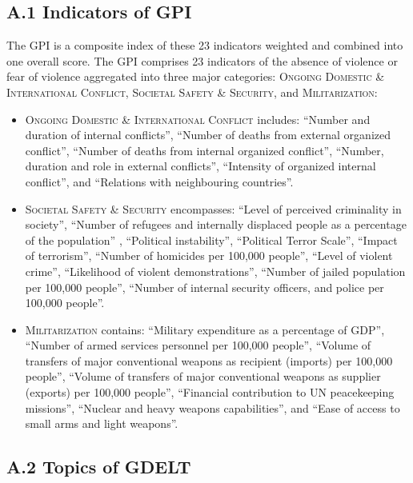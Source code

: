 \documentclass{bmcart}
\begin{document}
\subsection*{\textbf{A.1 Indicators of GPI}}
\label{appendix1}

The GPI is a composite index of these 23 indicators weighted and combined into one overall score. 
The GPI comprises 23 indicators of the absence of violence or fear of violence aggregated into three major categories: {\scshape Ongoing Domestic} \& {\scshape International Conflict}, {\scshape Societal Safety \& Security}, and {\scshape Militarization}:

\begin{itemize}
\item {\scshape Ongoing Domestic} \& {\scshape International Conflict} includes:
``Number and duration of internal conflicts'',  
``Number of deaths from external organized conflict'', ``Number of deaths from internal organized conflict'', ``Number, duration and role in external conflicts'', ``Intensity of organized internal conflict'', and ``Relations with neighbouring countries''.

\item {\scshape Societal Safety \& Security} encompasses:
``Level of perceived criminality in society'',
``Number of refugees and internally displaced people as a percentage of the population'' ,
``Political instability'',
``Political Terror Scale'',
``Impact of terrorism'',
``Number of homicides per 100,000 people'',
``Level of violent crime'',
``Likelihood of violent demonstrations'',
``Number of jailed population per 100,000 people'',
``Number of internal security officers, and police per 100,000 people''.

\item {\scshape Militarization} contains:
``Military expenditure as a percentage of GDP'',
``Number of armed services personnel per 100,000 people'',
``Volume of transfers of major conventional weapons as recipient (imports) per 100,000 people'',
``Volume of transfers of major conventional weapons as supplier (exports) per 100,000 people'',
``Financial contribution to UN peacekeeping missions'',
``Nuclear and heavy weapons capabilities'', and
``Ease of access to small arms and light weapons''. 
\end{itemize}


\subsection*{\textbf{A.2 Topics of GDELT}}
\label{appendix2}
\end{document}
